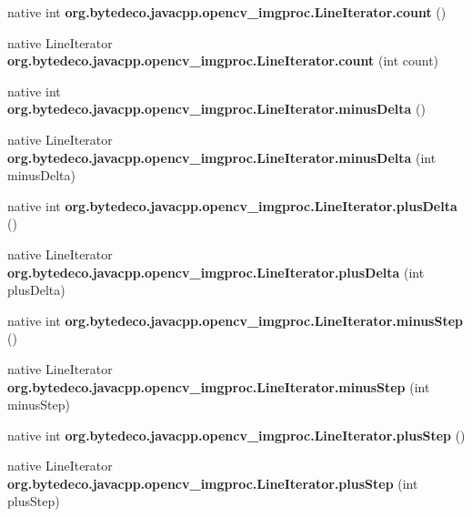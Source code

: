 \begin{DoxyCompactItemize}
native int {\bfseries org.\+bytedeco.\+javacpp.\+opencv\+\_\+imgproc.\+Line\+Iterator.\+count} ()
\item 
\mbox{\label{group__imgproc_gae7f92c5f421498ac0cdaa980f4efe18d}} 
native Line\+Iterator {\bfseries org.\+bytedeco.\+javacpp.\+opencv\+\_\+imgproc.\+Line\+Iterator.\+count} (int count)
\item 
\mbox{\label{group__imgproc_ga1110a1a25f654d252b9c20a8ac442f0e}} 
native int {\bfseries org.\+bytedeco.\+javacpp.\+opencv\+\_\+imgproc.\+Line\+Iterator.\+minus\+Delta} ()
\item 
\mbox{\label{group__imgproc_ga9d494e72b584598875663faf2a797703}} 
native Line\+Iterator {\bfseries org.\+bytedeco.\+javacpp.\+opencv\+\_\+imgproc.\+Line\+Iterator.\+minus\+Delta} (int minus\+Delta)
\item 
\mbox{\label{group__imgproc_gaf0414d4bebd834879ca2e0c843cd2230}} 
native int {\bfseries org.\+bytedeco.\+javacpp.\+opencv\+\_\+imgproc.\+Line\+Iterator.\+plus\+Delta} ()
\item 
\mbox{\label{group__imgproc_ga7b49feee4b3741bfe2faebceeecc6b99}} 
native Line\+Iterator {\bfseries org.\+bytedeco.\+javacpp.\+opencv\+\_\+imgproc.\+Line\+Iterator.\+plus\+Delta} (int plus\+Delta)
\item 
\mbox{\label{group__imgproc_ga85b6ae67531003dfc1763f1500a74212}} 
native int {\bfseries org.\+bytedeco.\+javacpp.\+opencv\+\_\+imgproc.\+Line\+Iterator.\+minus\+Step} ()
\item 
\mbox{\label{group__imgproc_gae7a89b2048d1e3e1b3cd039f8f8c090e}} 
native Line\+Iterator {\bfseries org.\+bytedeco.\+javacpp.\+opencv\+\_\+imgproc.\+Line\+Iterator.\+minus\+Step} (int minus\+Step)
\item 
\mbox{\label{group__imgproc_ga88130dcb76e1f669323205e41580225c}} 
native int {\bfseries org.\+bytedeco.\+javacpp.\+opencv\+\_\+imgproc.\+Line\+Iterator.\+plus\+Step} ()
\item 
\mbox{\label{group__imgproc_gab9e2be0994d1d5d48935729096f7cc45}} 
native Line\+Iterator {\bfseries org.\+bytedeco.\+javacpp.\+opencv\+\_\+imgproc.\+Line\+Iterator.\+plus\+Step} (int plus\+Step)
\end{DoxyCompactItemize}
